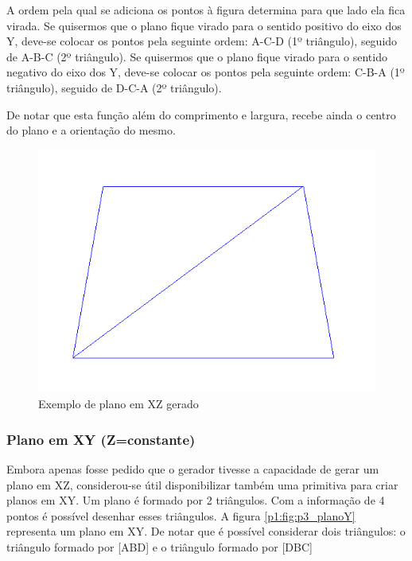 A ordem pela qual se adiciona os pontos à figura determina para que lado ela fica virada. Se quisermos que o plano fique virado para o sentido positivo do eixo dos Y, deve-se colocar os pontos pela seguinte ordem: A-C-D (1º triângulo), seguido de A-B-C (2º triângulo). Se quisermos que o plano fique virado para o sentido negativo do eixo dos Y, deve-se colocar os pontos pela seguinte ordem: C-B-A (1º triângulo), seguido de D-C-A (2º triângulo).



De notar que esta função além do comprimento e largura, recebe ainda o centro do plano e a orientação do mesmo.

\begin{figure}[htpb]
	\centering
	\includegraphics[scale=0.5]{imagens/p3_plano.png}
	\caption{Exemplo de plano em XZ gerado}
	\label{p1:fig:p3_plano_4_2}
\end{figure}


\newpage

\subsubsection{Plano em XY (Z=constante)}

Embora apenas fosse pedido que o gerador tivesse a capacidade de gerar um plano em XZ, considerou-se útil disponibilizar também uma primitiva para criar planos em XY.
Um plano é formado por 2 triângulos. Com a informação de 4 pontos é possível desenhar esses triângulos. A figura \ref{p1:fig:p3_planoY} representa um plano em XY. De notar que é possível considerar dois triângulos: o triângulo formado por [ABD] e o triângulo formado por [DBC]

